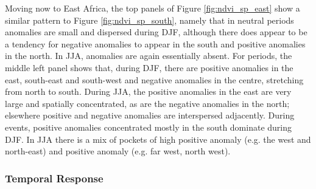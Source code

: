 Moving now to East Africa, the top panels of Figure \ref{fig:ndvi_sp_east} show
a similar pattern to Figure \ref{fig:ndvi_sp_south}, namely that in neutral
periods anomalies are small and dispersed during DJF, although there does appear
to be a tendency for negative anomalies to appear in the south and positive
anomalies in the north. In JJA, anomalies are again essentially absent. For
\elnino{} periods, the middle left panel shows that, during DJF, there are
positive anomalies in the east, south-east and south-west and negative anomalies
in the centre, stretching from north to south. During JJA, the positive
anomalies in the east are very large and spatially concentrated, as are the
negative anomalies in the north; elsewhere positive and negative anomalies are
interspersed adjacently. During \nina{} events, positive anomalies concentrated
mostly in the south dominate during DJF. In JJA there is a mix of pockets of
high positive anomaly (e.g. the west and north-east) and positive anomaly
(e.g. far west, north west).

\subsubsection{Temporal Response}

